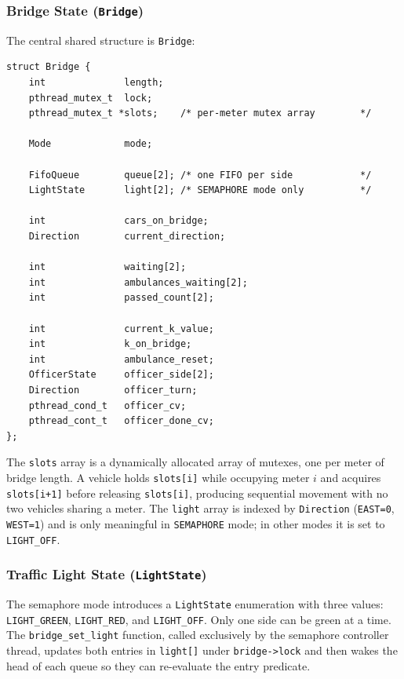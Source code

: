 \documentclass[12pt]{article}
\begin{document}
\subsubsection{Bridge State (\texttt{Bridge})}

The central shared structure is \texttt{Bridge}:

\begin{lstlisting}[style=cstyle, caption={Bridge structure (\texttt{bridge.h}).}]
struct Bridge {
    int              length;
    pthread_mutex_t  lock;
    pthread_mutex_t *slots;    /* per-meter mutex array        */

    Mode             mode;

    FifoQueue        queue[2]; /* one FIFO per side            */
    LightState       light[2]; /* SEMAPHORE mode only          */

    int              cars_on_bridge;
    Direction        current_direction;

    int              waiting[2];
    int              ambulances_waiting[2];
    int              passed_count[2];

    int              current_k_value;
    int              k_on_bridge;
    int              ambulance_reset;
    OfficerState     officer_side[2];
    Direction        officer_turn;
    pthread_cond_t   officer_cv;
    pthread_cont_t   officer_done_cv;
};
\end{lstlisting}

The \texttt{slots} array is a dynamically allocated array of mutexes, one
per meter of bridge length. A vehicle holds \texttt{slots[i]} while
occupying meter $i$ and acquires \texttt{slots[i+1]} before releasing
\texttt{slots[i]}, producing sequential movement with no two vehicles
sharing a meter. The \texttt{light} array is indexed by \texttt{Direction}
(\texttt{EAST=0}, \texttt{WEST=1}) and is only meaningful in
\texttt{SEMAPHORE} mode; in other modes it is set to \texttt{LIGHT\_OFF}.

\subsubsection{Traffic Light State (\texttt{LightState})}

The semaphore mode introduces a \texttt{LightState} enumeration with three
values: \texttt{LIGHT\_GREEN}, \texttt{LIGHT\_RED}, and \texttt{LIGHT\_OFF}.
Only one side can be green at a time. The \texttt{bridge\_set\_light}
function, called exclusively by the semaphore controller thread, updates
both entries in \texttt{light[]} under \texttt{bridge->lock} and then
wakes the head of each queue so they can re-evaluate the entry predicate.
\end{document}
